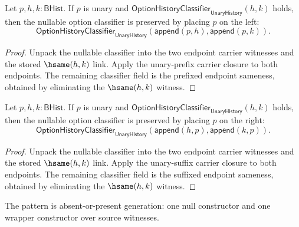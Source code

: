 \begin{theorem}
\label{thm:option-history-classifier-unary-prefix-closed}
Let $p,h,k:\mathsf{BHist}$. If $p$ is unary and
$\mathsf{OptionHistoryClassifier}_{\mathsf{UnaryHistory}}(h,k)$ holds, then
the nullable option classifier is preserved by placing $p$ on the left:
$$
\mathsf{OptionHistoryClassifier}_{\mathsf{UnaryHistory}}
  (\mathsf{append}(p,h),\mathsf{append}(p,k)).
$$
\end{theorem}
\begin{proof}
Unpack the nullable classifier into the two endpoint carrier witnesses and the
stored $\hsame(h,k)$ link. Apply the unary-prefix carrier closure to both
endpoints. The remaining classifier field is the prefixed endpoint sameness,
obtained by eliminating the $\hsame(h,k)$ witness.
\end{proof}

\begin{theorem}
\label{thm:option-history-classifier-unary-suffix-closed}
Let $p,h,k:\mathsf{BHist}$. If $p$ is unary and
$\mathsf{OptionHistoryClassifier}_{\mathsf{UnaryHistory}}(h,k)$ holds, then
the nullable option classifier is preserved by placing $p$ on the right:
$$
\mathsf{OptionHistoryClassifier}_{\mathsf{UnaryHistory}}
  (\mathsf{append}(h,p),\mathsf{append}(k,p)).
$$
\end{theorem}
\begin{proof}
Unpack the nullable classifier into the two endpoint carrier witnesses and the
stored $\hsame(h,k)$ link. Apply the unary-suffix carrier closure to both
endpoints. The remaining classifier field is the suffixed endpoint sameness,
obtained by eliminating the $\hsame(h,k)$ witness.
\end{proof}

\begin{definition}
\label{def:option-pattern-specification}
The pattern is absent-or-present generation: one null constructor and one wrapper constructor over source witnesses.
\end{definition}


